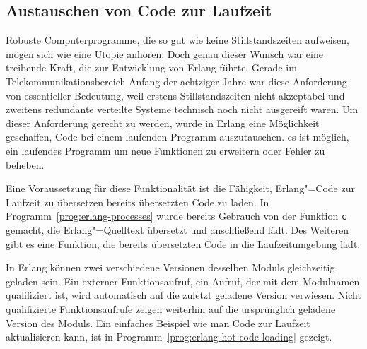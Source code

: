 \subsection{Austauschen von Code zur Laufzeit}

Robuste Computerprogramme, die so gut wie keine Stillstandszeiten aufweisen, mögen sich wie eine Utopie anhören. Doch genau dieser Wunsch war eine treibende Kraft, die zur Entwicklung von Erlang führte. Gerade im Telekommunikationsbereich Anfang der achtziger Jahre war diese Anforderung von essentieller Bedeutung, weil erstens Stillstandszeiten nicht akzeptabel und zweitens redundante verteilte Systeme technisch noch nicht ausgereift waren. Um dieser Anforderung gerecht zu werden, wurde in Erlang eine Möglichkeit geschaffen, Code bei einem laufenden Programm auszutauschen. \Dah es ist möglich, ein laufendes Programm um neue Funktionen zu erweitern oder Fehler zu beheben.

Eine Voraussetzung für diese Funktionalität ist die Fähigkeit, Erlang"=Code zur Laufzeit zu übersetzen \bzw bereits übersetzten Code zu laden. In Programm~\ref{prog:erlang-processes} wurde bereits Gebrauch von der Funktion \lstinline{c} gemacht, die Erlang"=Quelltext übersetzt und anschließend lädt. Des Weiteren gibt es eine Funktion, die bereits übersetzten Code in die Laufzeitumgebung lädt.

In Erlang können zwei verschiedene Versionen desselben Moduls gleichzeitig geladen sein. Ein externer Funktionsaufruf, \dah ein Aufruf, der mit dem Modulnamen qualifiziert ist, wird automatisch auf die zuletzt geladene Version verwiesen. Nicht qualifizierte Funktionsaufrufe zeigen weiterhin auf die ursprünglich geladene Version des Moduls. Ein einfaches Beispiel wie man Code zur Laufzeit aktualisieren kann, ist in Programm~\ref{prog:erlang-hot-code-loading} gezeigt.

